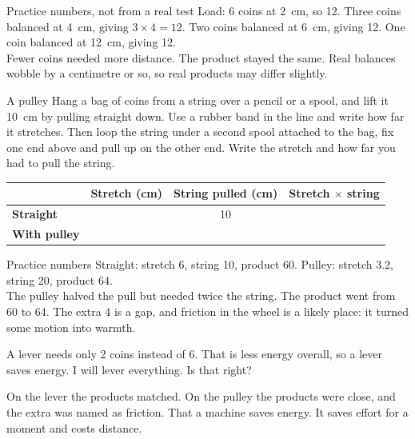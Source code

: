 \begin{worked}{Practice numbers, not from a real test}
Load: 6 coins at 2~cm, so 12. Three coins balanced at 4~cm, giving $3\times4=12$. Two coins balanced at 6~cm, giving 12. One coin balanced at 12~cm, giving 12.\\
Fewer coins needed more distance. The product stayed the same. Real balances wobble by a centimetre or so, so real products may differ slightly.
\end{worked}

\begin{tryit}{A pulley}
Hang a bag of coins from a string over a pencil or a spool, and lift it 10~cm by pulling straight down. Use a rubber band in the line and write how far it stretches. Then loop the string under a second spool attached to the bag, fix one end above and pull up on the other end. Write the stretch and how far you had to pull the string.\par\medskip
\renewcommand{\arraystretch}{1.6}
\begin{tabular}{|l|c|c|c|}
\hline
 & \textbf{Stretch (cm)} & \textbf{String pulled (cm)} & \textbf{Stretch $\times$ string}\\ \hline
\textbf{Straight} & & 10 & \\ \hline
\textbf{With pulley} & & & \\ \hline
\end{tabular}
\end{tryit}

\begin{worked}{Practice numbers}
Straight: stretch 6, string 10, product 60. Pulley: stretch 3.2, string 20, product 64.\\
The pulley halved the pull but needed twice the string. The product went from 60 to 64. The extra 4 is a gap, and friction in the wheel is a likely place: it turned some motion into warmth.
\end{worked}

\begin{multix}[hmm]\multixbot[hmm]\tcblower
A lever needs only 2 coins instead of 6. That is less energy overall, so a lever saves energy. I will lever everything. Is that right?
\end{multix}

{On the lever the products matched. On the pulley the products were close, and the extra was named as friction.}
{That a machine saves energy. It saves effort for a moment and costs distance.}

